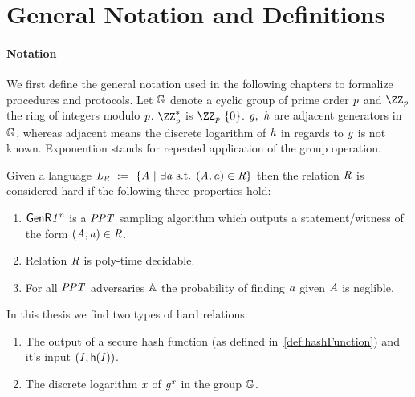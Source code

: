 \section{General Notation and Definitions}\label{sec:generalNotationDefinitions}

\paragraph{Notation}
We first define the general notation used in the following chapters to formalize procedures and protocols. Let $\mathbb{G}$ denote a cyclic group of prime order $\mathit{p}$ and $\cnstIntegersPrime{\varPrime}$
the ring of integers modulo $\mathit{p}$. $\cnstIntegersPrimeWithoutZero{\varPrime}$ is $\cnstIntegersPrime{\varPrime} \opExcluding \funList{0}$. $\mathit{g} ,~ \mathit{h}$ are adjacent
generators in $\mathbb{G}$, whereas adjacent means the discrete logarithm of $\mathit{h}$ in regards to $\mathit{g}$ is not known. Exponention stands for repeated application of the group operation.

\begin{definition}\label{def:hardRelation}
    Given a language $\mathit{L}_{\mathit{R}} ~:=~ \{\mathit{A} ~|~ \exists\mathit{a} \text{ s.t. } (\mathit{A}, \mathit{a}) \in \mathit{R}\}$ then the relation $\mathit{R}$ is
    considered hard if the following three properties hold:~\cite{aumayr2020bitcoinchannels}
    \begin{enumerate}
        \item $\mathsf{GenR}{\mathit{1^n}}$ is a $\mathit{PPT}$ sampling algorithm which outputs a statement/witness of the form $(\mathit{A}, \mathit{a}) \in \mathit{R}$.
        \item Relation $\mathit{R}$ is poly-time decidable.
        \item For all $\mathit{PPT}$ adversaries $\mathbb{A}$ the probability of finding $\mathit{a}$ given $\mathit{A}$ is neglible.
    \end{enumerate}
    In this thesis we find two types of hard relations:
    \begin{enumerate}
        \item The output of a secure hash function (as defined in~\ref{def:hashFunction}) and it's input $(\mathit{I}, \mathsf{h} (\mathit{I}))$.
        \item The discrete logarithm $\mathit{x}$ of $\mathit{g}^{\mathit{x}}$ in the group $\mathbb{G}$.
    \end{enumerate}
\end{definition}


